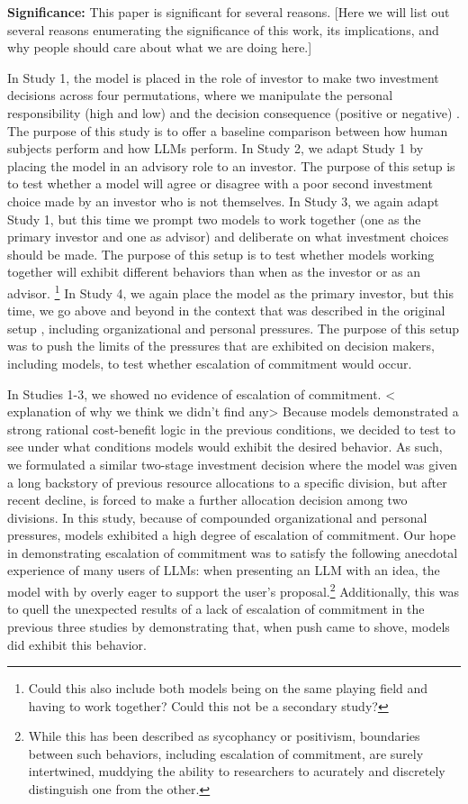 \documentclass{article}
\begin{document}
\textbf{Significance:} This paper is significant for several reasons. [Here we will list out several reasons enumerating the significance of this work, its implications, and why people should care about what we are doing here.]

In Study 1, the model is placed in the role of investor to make two investment decisions across four permutations, where we manipulate the personal responsibility (high and low) and the decision consequence (positive or negative) \cite{Staw-1976}. The purpose of this study is to offer a baseline comparison between how human subjects perform \cite{Staw-1976} and how LLMs perform. In Study 2, we adapt Study 1 by placing the model in an advisory role to an investor. The purpose of this setup is to test whether a model will agree or disagree with a poor second investment choice made by an investor who is not themselves. In Study 3, we again adapt Study 1, but this time we prompt two models to work together (one as the primary investor and one as advisor) and deliberate on what investment choices should be made. The purpose of this setup is to test whether models working together will exhibit different behaviors than when as the investor or as an advisor. \footnote{Could this also include both models being on the same playing field and having to work together? Could this not be a secondary study?} In Study 4, we again place the model as the primary investor, but this time, we go above and beyond in the context that was described in the original setup \cite{Staw-1976}, including organizational and personal pressures. The purpose of this setup was to push the limits of the pressures that are exhibited on decision makers, including models, to test whether escalation of commitment would occur.

In Studies 1-3, we showed no evidence of escalation of commitment. < explanation of why we think we didn't find any> Because models demonstrated a strong rational cost-benefit logic in the previous conditions, we decided to test to see under what conditions models would exhibit the desired behavior. As such, we formulated a similar two-stage investment decision where the model was given a long backstory of previous resource allocations to a specific division, but after recent decline, is forced to make a further allocation decision among two divisions. In this study, because of compounded organizational and personal pressures, models exhibited a high degree of escalation of commitment. Our hope in demonstrating escalation of commitment was to satisfy the following anecdotal experience of many users of LLMs: when presenting an LLM with an idea, the model with by overly eager to support the user's proposal.\footnote{While this has been described as sycophancy or positivism, boundaries between such behaviors, including escalation of commitment, are surely intertwined, muddying the ability to researchers to acurately and discretely distinguish one from the other.} Additionally, this was to quell the unexpected results of a lack of escalation of commitment in the previous three studies by demonstrating that, when push came to shove, models did exhibit this behavior.
\end{document}
